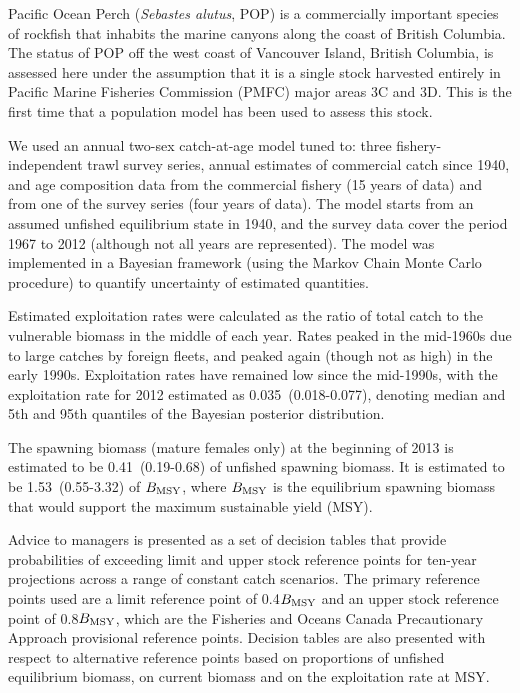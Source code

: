 


Pacific Ocean Perch (\emph{Sebastes alutus}, POP) is a commercially important species of rockfish that inhabits the marine canyons along the coast of British Columbia. The status of POP off the west coast of Vancouver Island, British Columbia, is assessed here under the assumption that it is a single stock harvested entirely in Pacific Marine Fisheries Commission (PMFC) major areas 3C and 3D. This is the first time that a population model has been used to assess this stock.


We used an annual two-sex catch-at-age model tuned to: three fishery-independent trawl survey series, annual estimates of commercial catch since 1940, and age composition data from the commercial fishery (15 years of data) and from one of the survey series (four years of data). The model starts from an assumed unfished equilibrium state in 1940, and the survey data cover the period 1967 to 2012 (although not all years are represented). The model was implemented in a Bayesian framework (using the Markov Chain Monte Carlo procedure) to quantify uncertainty of estimated quantities.


Estimated exploitation rates were calculated as the ratio of total catch to the vulnerable biomass in the middle of each year. Rates peaked in the mid-1960s due to large catches by foreign fleets, and peaked again (though not as high) in the early 1990s. Exploitation rates have remained low since the mid-1990s, with the exploitation rate for 2012 estimated as 0.035~(0.018-0.077), denoting median and 5th and 95th quantiles of the Bayesian posterior distribution.

The spawning biomass (mature females only) at the beginning of 2013 is estimated to be 0.41~(0.19-0.68) of unfished spawning biomass. It is estimated to be 1.53~(0.55-3.32) of $B_\mathrm{MSY}$, where $B_\mathrm{MSY}$ is the equilibrium spawning biomass that would support the maximum sustainable yield (MSY). 

Advice to managers is presented as a set of decision tables that provide probabilities of exceeding limit and upper stock reference points for ten-year projections across a range of constant catch scenarios. The primary reference points used are a limit reference point of 0.4$B_\mathrm{MSY}$ and an upper stock reference point of 0.8$B_\mathrm{MSY}$, which are the Fisheries and Oceans Canada Precautionary Approach provisional reference points. Decision tables are also presented with respect to alternative reference points based on proportions of unfished equilibrium biomass, on current biomass and on the exploitation rate at MSY.

